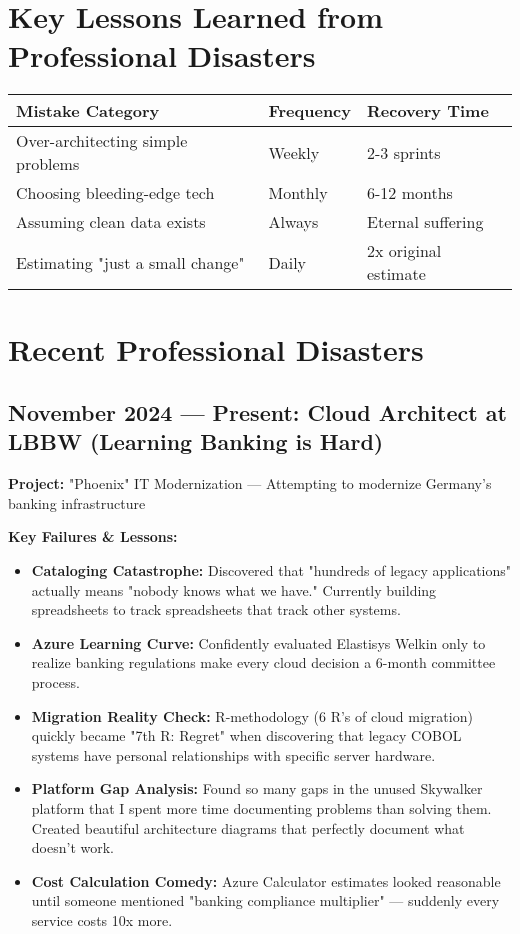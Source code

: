 \documentclass[11pt,a4paper]{article}
\begin{document}
\section*{Key Lessons Learned from Professional Disasters}

\begin{tabularx}{\textwidth}{X|X|X}
\textbf{Mistake Category} & \textbf{Frequency} & \textbf{Recovery Time} \\
\hline
Over-architecting simple problems & Weekly & 2-3 sprints \\
Choosing bleeding-edge tech & Monthly & 6-12 months \\
Assuming clean data exists & Always & Eternal suffering \\
Estimating "just a small change" & Daily & 2x original estimate \\
\end{tabularx}

\section*{Recent Professional Disasters}

\subsection*{November 2024 — Present: Cloud Architect at LBBW (Learning Banking is Hard)}

\textbf{Project:} "Phoenix" IT Modernization — Attempting to modernize Germany's banking infrastructure

\textbf{Key Failures \& Lessons:}
\begin{itemize}[leftmargin=1.5em,itemsep=0.2em]
\item \textbf{Cataloging Catastrophe:} Discovered that "hundreds of legacy applications" actually means "nobody knows what we have." Currently building spreadsheets to track spreadsheets that track other systems.
\item \textbf{Azure Learning Curve:} Confidently evaluated Elastisys Welkin only to realize banking regulations make every cloud decision a 6-month committee process.
\item \textbf{Migration Reality Check:} R-methodology (6 R's of cloud migration) quickly became "7th R: Regret" when discovering that legacy COBOL systems have personal relationships with specific server hardware.
\item \textbf{Platform Gap Analysis:} Found so many gaps in the unused Skywalker platform that I spent more time documenting problems than solving them. Created beautiful architecture diagrams that perfectly document what doesn't work.
\item \textbf{Cost Calculation Comedy:} Azure Calculator estimates looked reasonable until someone mentioned "banking compliance multiplier" — suddenly every service costs 10x more.
\end{itemize}
\end{document}
